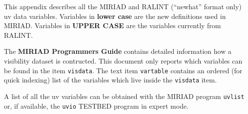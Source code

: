 %

This appendix describes all the MIRIAD and RALINT (``newhat'' format
only) uv data variables.  Variables in {\bf lower case} are the new
definitions used in MIRIAD.  Variables in {\bf UPPER CASE} are the
variables currently from RALINT.

The {\bf MIRIAD Programmers Guide} contains detailed information how a
visibility dataset is contructed.  This document only reports which
variables can be found in the item {\tt visdata}. The text item
{\tt vartable} contains an ordered (for quick indexing) list of the
variables which live inside the {\tt visdata} item.

A list of all the uv variables can be obtained with the MIRIAD program
{\tt uvlist} or, if available, the {\tt uvio} TESTBED program in expert
mode.

